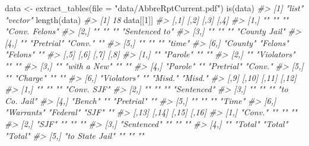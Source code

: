 \documentclass[
  12pt,
  openany]{book}
\newenvironment{Shaded}{\begin{snugshade}}{\end{snugshade}}
\newcommand{\AttributeTok}[1]{\textcolor[rgb]{0.61,0.61,0.61}{#1}}
\newcommand{\CommentTok}[1]{\textcolor[rgb]{0.37,0.37,0.37}{\textit{#1}}}
\newcommand{\DecValTok}[1]{\textcolor[rgb]{0.06,0.06,0.06}{#1}}
\newcommand{\FunctionTok}[1]{\textcolor[rgb]{0,0,0}{#1}}
\newcommand{\NormalTok}[1]{#1}
\newcommand{\OtherTok}[1]{\textcolor[rgb]{0.37,0.37,0.37}{#1}}
\newcommand{\StringTok}[1]{\textcolor[rgb]{0.5,0.5,0.5}{#1}}
\begin{document}
\begin{Shaded}
\begin{Highlighting}[]
\NormalTok{data }\OtherTok{\textless{}{-}} \FunctionTok{extract\_tables}\NormalTok{(}\AttributeTok{file =} \StringTok{"data/AbbreRptCurrent.pdf"}\NormalTok{)}
\FunctionTok{is}\NormalTok{(data)}
\CommentTok{\#\textgreater{} [1] "list"   "vector"}
\FunctionTok{length}\NormalTok{(data)}
\CommentTok{\#\textgreater{} [1] 18}
\NormalTok{data[[}\DecValTok{1}\NormalTok{]]}
\CommentTok{\#\textgreater{}      [,1]     [,2]       [,3]     [,4]          }
\CommentTok{\#\textgreater{} [1,] ""       ""         ""       "Conv. Felons"}
\CommentTok{\#\textgreater{} [2,] ""       ""         ""       "Sentenced to"}
\CommentTok{\#\textgreater{} [3,] ""       ""         ""       "County Jail" }
\CommentTok{\#\textgreater{} [4,] ""       "Pretrial" "Conv."  ""            }
\CommentTok{\#\textgreater{} [5,] ""       ""         ""       "time"        }
\CommentTok{\#\textgreater{} [6,] "County" "Felons"   "Felons" ""            }
\CommentTok{\#\textgreater{}      [,5]        [,6]         [,7]       [,8]   }
\CommentTok{\#\textgreater{} [1,] ""          "Parole"     ""         ""     }
\CommentTok{\#\textgreater{} [2,] ""          "Violators"  ""         ""     }
\CommentTok{\#\textgreater{} [3,] ""          "with a New" ""         ""     }
\CommentTok{\#\textgreater{} [4,] "Parole"    ""           "Pretrial" "Conv."}
\CommentTok{\#\textgreater{} [5,] ""          "Charge"     ""         ""     }
\CommentTok{\#\textgreater{} [6,] "Violators" ""           "Misd."    "Misd."}
\CommentTok{\#\textgreater{}      [,9]       [,10]     [,11]      [,12]        }
\CommentTok{\#\textgreater{} [1,] ""         ""        ""         "Conv. SJF"  }
\CommentTok{\#\textgreater{} [2,] ""         ""        ""         "Sentenced"  }
\CommentTok{\#\textgreater{} [3,] ""         ""        ""         "to Co. Jail"}
\CommentTok{\#\textgreater{} [4,] "Bench"    ""        "Pretrial" ""           }
\CommentTok{\#\textgreater{} [5,] ""         ""        ""         "Time"       }
\CommentTok{\#\textgreater{} [6,] "Warrants" "Federal" "SJF"      ""           }
\CommentTok{\#\textgreater{}      [,13]           [,14]    [,15]   [,16]     }
\CommentTok{\#\textgreater{} [1,] "Conv."         ""       ""      ""        }
\CommentTok{\#\textgreater{} [2,] "SJF"           ""       ""      ""        }
\CommentTok{\#\textgreater{} [3,] "Sentenced"     ""       ""      ""        }
\CommentTok{\#\textgreater{} [4,] ""              "Total"  "Total" "Total"   }
\CommentTok{\#\textgreater{} [5,] "to State Jail" ""       ""      ""        }

\end{Highlighting}
\end{Shaded}
\end{document}
